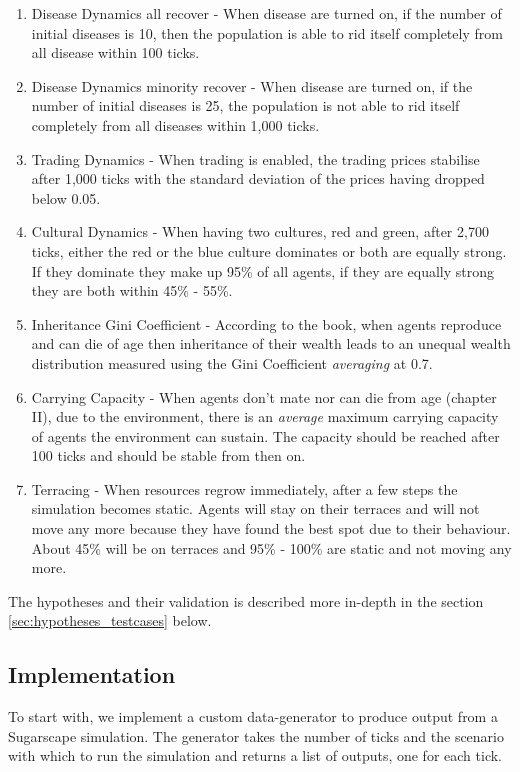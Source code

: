 \begin{enumerate}
	\item Disease Dynamics all recover - When disease are turned on, if the number of initial diseases is 10, then the population is  able to rid itself completely from all disease within 100 ticks. 
	
	\item Disease Dynamics minority recover - When disease are turned on, if the number of initial diseases is 25, the population is not able to rid itself completely from all diseases within 1,000 ticks.
	
	\item Trading Dynamics - When trading is enabled, the trading prices stabilise after 1,000 ticks with the standard deviation of the prices having dropped below 0.05.
	
	\item Cultural Dynamics - When having two cultures, red and green, after 2,700 ticks, either the red or the blue culture dominates or both are equally strong. If they dominate they make up 95\% of all agents, if they are equally strong they are both within 45\% - 55\%.
	
	\item Inheritance Gini Coefficient - According to the book, when agents reproduce and can die of age then inheritance of their wealth leads to an unequal wealth distribution measured using the Gini Coefficient \textit{averaging} at 0.7.
	
	\item Carrying Capacity - When agents don't mate nor can die from age (chapter II), due to the environment, there is an \textit{average} maximum carrying capacity of agents the environment can sustain. The capacity should be reached after 100 ticks and should be stable from then on.
		
	\item Terracing - When resources regrow immediately, after a few steps the simulation becomes static. Agents will stay on their terraces and will not move any more because they have found the best spot due to their behaviour. About 45\% will be on terraces and 95\% - 100\% are static and not moving any more.
\end{enumerate}

The hypotheses and their validation is described more in-depth in the section \ref{sec:hypotheses_testcases} below.

\subsection{Implementation}
To start with, we implement a custom data-generator to produce output from a Sugarscape simulation. The generator takes the number of ticks and the scenario with which to run the simulation and returns a list of outputs, one for each tick.

